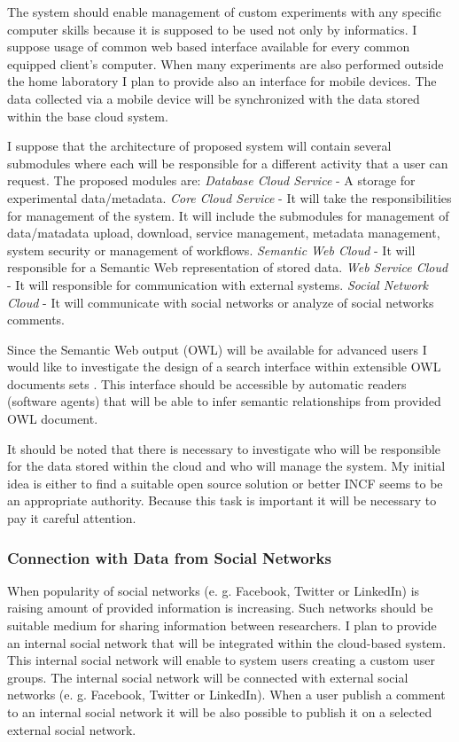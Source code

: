 \documentclass[a4paper, 10pt]{article}
\begin{document}
The system should enable management of custom experiments with any specific computer skills because it is supposed to be used not only by informatics. I suppose usage of common web based interface available for every common equipped client's computer. When many experiments are also performed outside the home laboratory I plan to provide also an interface for mobile devices. The data collected via a mobile device will be synchronized with the data stored within the base cloud system.

I suppose that the architecture of proposed system will contain several submodules where each will be responsible for a different activity that a user can request. The proposed modules are: \textit{Database Cloud Service} - A storage for experimental data/metadata. \textit{Core Cloud Service} - It will take the responsibilities for management of the system. It will include the submodules for management of data/matadata upload, download, service management, metadata management, system security or management of workflows. \textit{Semantic Web Cloud} - It will responsible for a Semantic Web representation of stored data. \textit{Web Service Cloud} - It will responsible for communication with external systems. \textit{Social Network Cloud} - It will communicate with social networks or analyze of social networks comments.

Since the Semantic Web output (OWL) will be available for advanced users I would like to investigate the design of a search interface within extensible OWL documents sets . This interface should be accessible by automatic readers (software agents) that will be able to infer semantic relationships from provided OWL document.

It should be noted that there is necessary to investigate who will be responsible for the data stored within the cloud and who will manage the system. My initial idea is either to find a suitable open source solution or better INCF seems to be an appropriate authority. Because this task is important it will be  necessary to pay it careful attention.

\subsubsection*{Connection with Data from Social Networks}

When popularity of social networks  (e. g. Facebook, Twitter or LinkedIn) is raising amount of provided information is increasing. Such networks should be suitable medium for sharing information between researchers. I plan to provide an internal social network that will be integrated within the cloud-based system. This internal social network will enable to system users creating a custom user groups. The internal social network will be connected with external social networks (e. g. Facebook, Twitter or LinkedIn). When a user publish a comment to an internal social network it will be also possible to publish it on a selected external social network.
\end{document}
